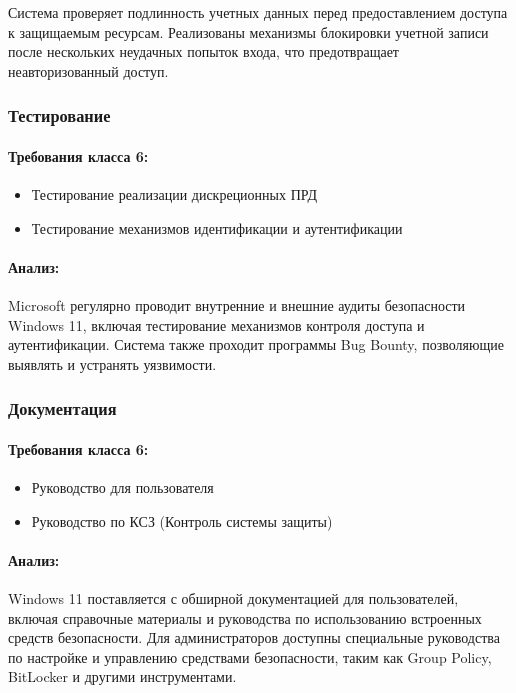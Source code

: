 \documentclass[a4paper, 14pt]{report}
\begin{document}
Система проверяет подлинность учетных данных перед предоставлением доступа к защищаемым ресурсам. Реализованы механизмы блокировки учетной записи после нескольких неудачных попыток входа, что предотвращает неавторизованный доступ.

\subsubsection{Тестирование}

\paragraph{Требования класса 6:}
\begin{itemize}
    \item Тестирование реализации дискреционных ПРД
    \item Тестирование механизмов идентификации и аутентификации
\end{itemize}

\paragraph{Анализ:}
Microsoft регулярно проводит внутренние и внешние аудиты безопасности Windows 11, включая тестирование механизмов контроля доступа и аутентификации. Система также проходит программы Bug Bounty, позволяющие выявлять и устранять уязвимости.

\subsubsection{Документация}

\paragraph{Требования класса 6:}
\begin{itemize}
    \item Руководство для пользователя
    \item Руководство по КСЗ (Контроль системы защиты)
\end{itemize}

\paragraph{Анализ:}
Windows 11 поставляется с обширной документацией для пользователей, включая справочные материалы и руководства по использованию встроенных средств безопасности. Для администраторов доступны специальные руководства по настройке и управлению средствами безопасности, таким как Group Policy, BitLocker и другими инструментами.
\end{document}
